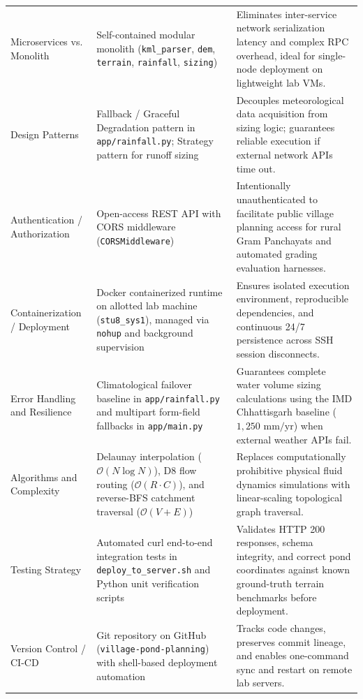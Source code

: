 \documentclass[manuscript,screen]{acmart}
\begin{document}
\begin{table}[t]
\begin{tabular}{p{3.2cm}p{5.4cm}p{6.6cm}}
    \addlinespace
    Microservices vs. Monolith & Self-contained modular monolith (\texttt{kml\_parser}, \texttt{dem}, \texttt{terrain}, \texttt{rainfall}, \texttt{sizing}) & Eliminates inter-service network serialization latency and complex RPC overhead, ideal for single-node deployment on lightweight lab VMs. \\
    \addlinespace
    Design Patterns & Fallback / Graceful Degradation pattern in \texttt{app/rainfall.py}; Strategy pattern for runoff sizing & Decouples meteorological data acquisition from sizing logic; guarantees reliable execution if external network APIs time out. \\
    \addlinespace
    Authentication / Authorization & Open-access REST API with CORS middleware (\texttt{CORSMiddleware}) & Intentionally unauthenticated to facilitate public village planning access for rural Gram Panchayats and automated grading evaluation harnesses. \\
    \addlinespace
    Containerization / Deployment & Docker containerized runtime on allotted lab machine (\texttt{stu8\_sys1}), managed via \texttt{nohup} and background supervision & Ensures isolated execution environment, reproducible dependencies, and continuous 24/7 persistence across SSH session disconnects. \\
    \addlinespace
    Error Handling and Resilience & Climatological failover baseline in \texttt{app/rainfall.py} and multipart form-field fallbacks in \texttt{app/main.py} & Guarantees complete water volume sizing calculations using the IMD Chhattisgarh baseline ($1,250\text{ mm/yr}$) when external weather APIs fail. \\
    \addlinespace
    Algorithms and Complexity & Delaunay interpolation ($\mathcal{O}(N \log N)$), D8 flow routing ($\mathcal{O}(R \cdot C)$), and reverse-BFS catchment traversal ($\mathcal{O}(V + E)$) & Replaces computationally prohibitive physical fluid dynamics simulations with linear-scaling topological graph traversal. \\
    \addlinespace
    Testing Strategy & Automated curl end-to-end integration tests in \texttt{deploy\_to\_server.sh} and Python unit verification scripts & Validates HTTP 200 responses, schema integrity, and correct pond coordinates against known ground-truth terrain benchmarks before deployment. \\
    \addlinespace
    Version Control / CI-CD & Git repository on GitHub (\texttt{village-pond-planning}) with shell-based deployment automation & Tracks code changes, preserves commit lineage, and enables one-command sync and restart on remote lab servers. \\
    \bottomrule
  \end{tabular}
\end{table}
\end{document}
